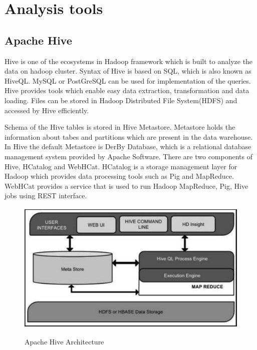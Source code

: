 \documentclass[9pt,twocolumn,twoside]{../../styles/osajnl}
\begin{document}
\section{Analysis tools}

\subsection{Apache Hive}

Hive is one of the ecosystems in Hadoop\cite{hadoop} framework which is built to
analyze the data on hadoop cluster. Syntax of Hive is based on SQL\cite{sql},
which is also known as HiveQL. MySQL or PostGreSQL\cite{postgresql} can be used for
implementation of the queries. Hive provides tools which enable easy
data extraction, transformation and data loading. Files can be stored
in Hadoop Distributed File System(HDFS)\cite{hdfs} and accessed by Hive
efficiently.

Schema of the Hive tables is stored in Hive Metastore. Metastore holds
the information about tabes and partitions which are present in the
data warehouse. In Hive the default Metastore is DerBy Database, which
is a relational database management system provided by Apache
Software.  There are two components of Hive, HCatalog and
WebHCat. HCatalog is a storage management layer for Hadoop which
provides data processing tools such as Pig and MapReduce. WebHCat
provides a service that is used to run Hadoop MapReduce, Pig, Hive
jobs using REST interface\cite{hive-website}.

\begin{figure}[ht]
  \includegraphics[width= \linewidth, height =
    2.5in]{images/hive_architecture.pdf}
  \caption{Apache Hive Architecture}\cite{hive-architecture}
\end{figure}
\end{document}
